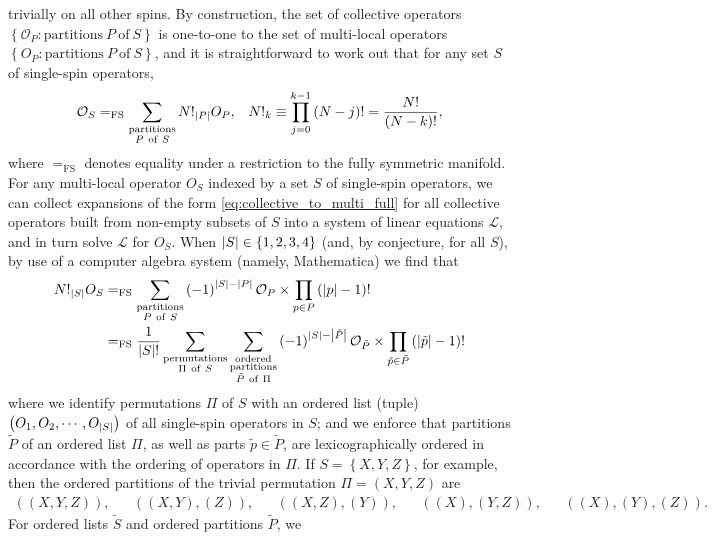 \documentclass[nofootinbib,notitlepage,11pt]{revtex4-2}
\renewcommand{\t}{\text} %
\newcommand{\f}[2]{\dfrac{#1}{#2}} %
\newcommand{\p}[1]{\left(#1\right)} %
\renewcommand{\set}[1]{\left\{#1\right\}} %
\newcommand{\1}{\mathds{1}}
\renewcommand{\L}{\mathcal{L}}
\renewcommand{\O}{\mathcal{O}}
\renewcommand{\P}{\mathcal{P}}
\newcommand{\EQFS}{=_{\text{FS}}}
\begin{document}
trivially on all other spins.  By construction, the set of collective
operators $\set{\O_P:\t{partitions}~P~\t{of}~S}$ is one-to-one to the
set of multi-local operators $\set{O_P:\t{partitions}~P~\t{of}~S}$,
and it is straightforward to work out that for any set $S$ of
single-spin operators,
\begin{align}
  \O_S
  \EQFS \sum_{\substack{\t{partitions}\\P~\t{of}~S}}
  N!_{\abs{P}} O_P,
  &&
  N!_k \equiv \prod_{j=0}^{k-1}\p{N-j}! = \f{N!}{\p{N-k}!},
  \label{eq:collective_to_multi_full}
\end{align}
where $\EQFS$ denotes equality under a restriction to the fully
symmetric manifold.  For any multi-local operator $O_S$ indexed by a
set $S$ of single-spin operators, we can collect expansions of the
form \eqref{eq:collective_to_multi_full} for all collective operators
built from non-empty subsets of $S$ into a system of linear equations
$\L$, and in turn solve $\L$ for $O_S$.  When
$\abs{S}\in\set{1,2,3,4}$ (and, by conjecture, for all $S$), by use of
a computer algebra system (namely, Mathematica) we find that
\begin{align}
  N!_{\abs{S}} O_S
  &\EQFS \sum_{\substack{\t{partitions}\\P~\t{of}~S}}
  \p{-1}^{\abs{S}-\abs{P}} \O_P \times \prod_{p\in P}\p{\abs{p}-1}!
  \label{eq:multi_to_collective_full} \\
  &\EQFS \f1{\abs{S}!} \sum_{\substack{\t{permutations}\\\Pi~\t{of}~S}}
  \sum_{\substack{\t{ordered}\\\t{partitions}\\\tilde P~\t{of}~\Pi}}
  \p{-1}^{\abs{S}-\abs{\tilde P}} \O_{\tilde P}
  \times \prod_{\tilde p\in\tilde P} \p{\abs{\tilde p}-1}!
  \label{eq:multi_to_collective_full_simp}
\end{align}
where we identify permutations $\Pi$ of $S$ with an ordered list
(tuple) $\p{O_1,O_2,\cdots,O_{\abs{S}}}$ of all single-spin operators
in $S$; and we enforce that partitions $\tilde P$ of an ordered list
$\Pi$, as well as parts $\tilde p\in\tilde P$, are lexicographically
ordered in accordance with the ordering of operators in $\Pi$.  If
$S=\set{X,Y,Z}$, for example, then the ordered partitions of the
trivial permutation $\Pi=\p{X,Y,Z}$ are
\begin{align}
  \p{\p{X,Y,Z}}, &&
  \p{\p{X,Y},\p{Z}}, &&
  \p{\p{X,Z},\p{Y}}, &&
  \p{\p{X},\p{Y,Z}}, &&
  \p{\p{X},\p{Y},\p{Z}}.
\end{align}
For ordered lists $\tilde S$ and ordered partitions $\tilde P$, we
\end{document}
